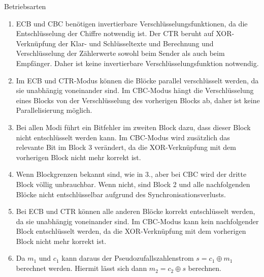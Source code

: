 \documentclass{article}
\begin{document}
\begin{exercise}{Betriebsarten}
  \begin{solution}
    \begin{enumerate}
        \item ECB und CBC benötigen invertierbare Verschlüsselungsfunktionen, da die Entschlüsselung der Chiffre notwendig ist. Der CTR beruht auf XOR-Verknüpfung der Klar- und Schlüsseltexte und Berechnung und Verschlüsselung der Zählerwerte sowohl beim Sender als auch beim Empfänger. Daher ist keine invertierbare Verschlüsselungsfunktion notwendig.
        \item Im ECB und CTR-Modus können die Blöcke parallel verschlüsselt werden, da sie unabhängig voneinander sind. Im CBC-Modus hängt die Verschlüsselung eines Blocks von der Verschlüsselung des vorherigen Blocks ab, daher ist keine Parallelisierung möglich.
        \item Bei allen Modi führt ein Bitfehler im zweiten Block dazu, dass dieser Block nicht entschlüsselt werden kann. Im CBC-Modus wird zusätzlich das relevante Bit im Block 3 verändert, da die XOR-Verknüpfung mit dem vorherigen Block nicht mehr korrekt ist.
        \item Wenn Blockgrenzen bekannt sind, wie in 3., aber bei CBC wird der dritte Block völlig unbrauchbar. Wenn nicht, sind Block 2 und alle nachfolgenden Blöcke nicht entschlüsselbar aufgrund des Synchronisationsverlusts.
        \item Bei ECB und CTR können alle anderen Blöcke korrekt entschlüsselt werden, da sie unabhängig voneinander sind. Im CBC-Modus kann kein nachfolgender Block entschlüsselt werden, da die XOR-Verknüpfung mit dem vorherigen Block nicht mehr korrekt ist.
        \item Da $m_1$ und $c_1$ kann daraus der Pseudozufallszahlenstrom $s=c_1\oplus m_1$ berechnet werden. Hiermit lässt sich dann $m_2=c_2\oplus s$ berechnen.
    \end{enumerate}
  \end{solution}
\end{exercise}
\end{document}
